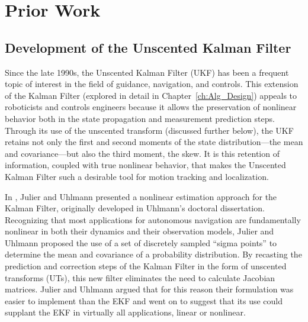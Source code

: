 \chapter{Prior Work}

\section{Development of the Unscented Kalman Filter}

Since the late 1990s, the Unscented Kalman Filter (UKF) has been a frequent topic of interest in the field of guidance, navigation, and controls. This extension of the Kalman Filter (explored in detail in Chapter~\ref{ch:Alg_Design}) appeals to roboticists and controls engineers because it allows the preservation of nonlinear behavior both in the state propagation and measurement prediction steps. Through its use of the unscented transform (discussed further below), the UKF retains not only the first and second moments of the state distribution---the mean and covariance---but also the third moment, the skew. It is this retention of information, coupled with true nonlinear behavior, that makes the Unscented Kalman Filter such a desirable tool for motion tracking and localization.

In \cite{Julier1997}, Julier and Uhlmann presented a nonlinear estimation approach for the Kalman Filter, originally developed in Uhlmann's doctoral dissertation. Recognizing that most applications for autonomous navigation are fundamentally nonlinear in both their dynamics and their observation models, Julier and Uhlmann proposed the use of a set of discretely sampled ``sigma points'' to determine the mean and covariance of a probability distribution. By recasting the prediction and correction steps of the Kalman Filter in the form of unscented transforms (UTs), this new filter eliminates the need to calculate Jacobian matrices. Julier and Uhlmann argued that for this reason their formulation was easier to implement than the EKF and went on to suggest that its use could supplant the EKF in virtually all applications, linear or nonlinear.


